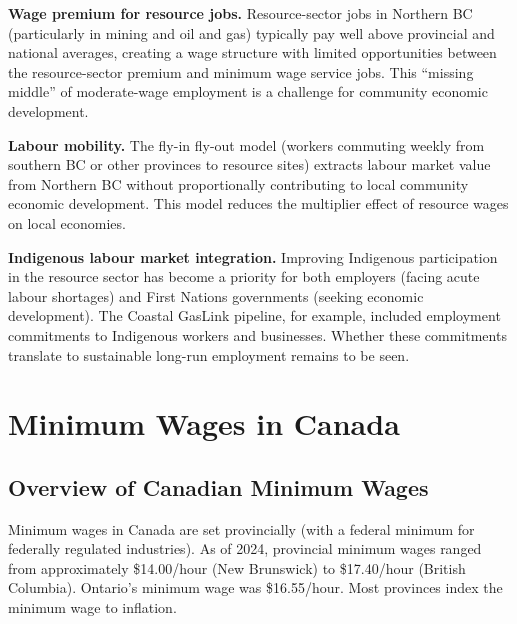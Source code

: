 \textbf{Wage premium for resource jobs.} Resource-sector jobs in Northern BC (particularly in mining and oil and gas) typically pay well above provincial and national averages, creating a wage structure with limited opportunities between the resource-sector premium and minimum wage service jobs. This ``missing middle'' of moderate-wage employment is a challenge for community economic development.

\textbf{Labour mobility.} The fly-in fly-out model (workers commuting weekly from southern BC or other provinces to resource sites) extracts labour market value from Northern BC without proportionally contributing to local community economic development. This model reduces the multiplier effect of resource wages on local economies.

\textbf{Indigenous labour market integration.} Improving Indigenous participation in the resource sector has become a priority for both employers (facing acute labour shortages) and First Nations governments (seeking economic development). The Coastal GasLink pipeline, for example, included employment commitments to Indigenous workers and businesses. Whether these commitments translate to sustainable long-run employment remains to be seen.

\section{Minimum Wages in Canada}

\subsection{Overview of Canadian Minimum Wages}

Minimum wages in Canada are set provincially (with a federal minimum for federally regulated industries). As of 2024, provincial minimum wages ranged from approximately \$14.00/hour (New Brunswick) to \$17.40/hour (British Columbia). Ontario's minimum wage was \$16.55/hour. Most provinces index the minimum wage to inflation.

